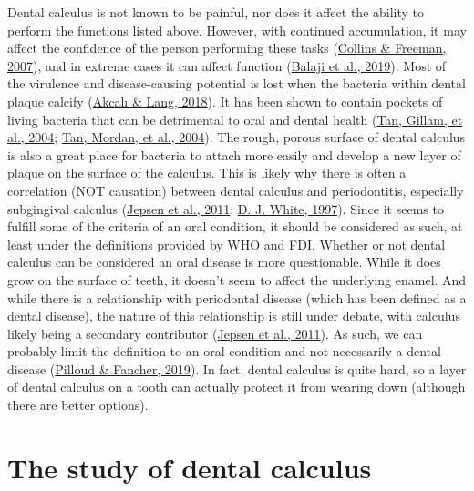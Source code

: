 \documentclass[
  b5paper,
]{book}
\begin{document}
Dental calculus is not known to be painful, nor does it affect the
ability to perform the functions listed above. However, with continued
accumulation, it may affect the confidence of the person performing
these tasks (\protect\hyperlink{ref-collinsHomelessDental2007}{Collins
\& Freeman, 2007}), and in extreme cases it can affect function
(\protect\hyperlink{ref-balajiUnusualPresentation2019}{Balaji et al.,
2019}). Most of the virulence and disease-causing potential is lost when
the bacteria within dental plaque calcify
(\protect\hyperlink{ref-akcaliDentalCalculus2018}{Akcalı \& Lang,
2018}). It has been shown to contain pockets of living bacteria that can
be detrimental to oral and dental health
(\protect\hyperlink{ref-tanCalculusUltrastructure2004}{Tan, Gillam, et
al., 2004}; \protect\hyperlink{ref-tanBacterialViability2004}{Tan,
Mordan, et al., 2004}). The rough, porous surface of dental calculus is
also a great place for bacteria to attach more easily and develop a new
layer of plaque on the surface of the calculus. This is likely why there
is often a correlation (NOT causation) between dental calculus and
periodontitis, especially subgingival calculus
(\protect\hyperlink{ref-jepsenCalculusRemoval2011}{Jepsen et al., 2011};
\protect\hyperlink{ref-whiteDentalCalculus1997}{D. J. White, 1997}).
Since it seems to fulfill some of the criteria of an oral condition, it
should be considered as such, at least under the definitions provided by
WHO and FDI. Whether or not dental calculus can be considered an oral
disease is more questionable. While it does grow on the surface of
teeth, it doesn't seem to affect the underlying enamel. And while there
is a relationship with periodontal disease (which has been defined as a
dental disease), the nature of this relationship is still under debate,
with calculus likely being a secondary contributor
(\protect\hyperlink{ref-jepsenCalculusRemoval2011}{Jepsen et al.,
2011}). As such, we can probably limit the definition to an oral
condition and not necessarily a dental disease
(\protect\hyperlink{ref-pilloudOutliningDefinition2019}{Pilloud \&
Fancher, 2019}). In fact, dental calculus is quite hard, so a layer of
dental calculus on a tooth can actually protect it from wearing down
(although there are better options).

\hypertarget{intro-study}{%
\section{The study of dental calculus}\label{intro-study}}
\end{document}
